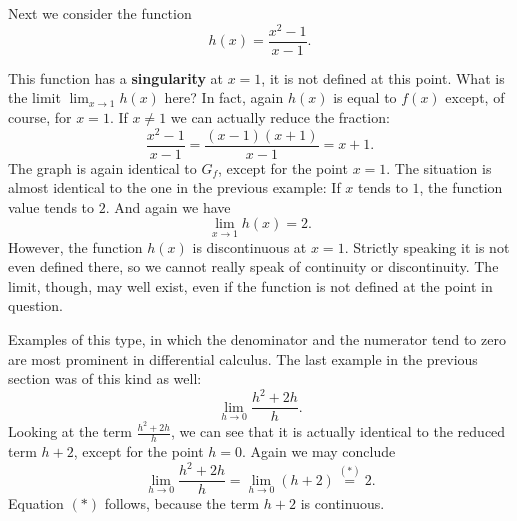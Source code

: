 \documentclass[12pt,eng]{skript_ogg}
\begin{document}
\begin{beispiel}
Next we consider the function 
\[h(x)=\frac{x^2-1}{x-1}.\]
\begin{center}
\end{center}

\vspace{-3mm}

This function has a \textbf{singularity} at $x=1$, it is not defined at this point. What is the limit $\lim_{x\rightarrow 1}h(x)$ here? In fact, again $h(x)$ is equal to $f(x)$ except, of course, for $x=1$. If $x\neq 1$ we can actually reduce the fraction:
\[\frac{x^2-1}{x-1}=\frac{(x-1)(x+1)}{x-1}=x+1.\]
The graph is again identical to $G_f$, except for the point $x=1$. The situation is almost identical to the one in the previous example: If $x$ tends to $1$, the function value tends to $2$. And again we have
\[\lim_{x\rightarrow 1}h(x)=2.\]
However, the function $h(x)$ is discontinuous at $x=1$. Strictly speaking it is not even defined there, so we cannot really speak of continuity or discontinuity. The limit, though, may well exist, even if the function is not defined at the point in question.
\end{beispiel}

Examples of this type, in which the denominator and the numerator tend to zero are most prominent in differential calculus. The last example in the previous section was of this kind as well:
\[\lim_{h\rightarrow 0}\frac{h^2+2h}{h}.\]
Looking at the term $\frac{h^2+2h}{h}$, we can see that it is actually identical to the reduced term $h+2$, except for the point $h=0$. Again we may conclude
\[\lim_{h\rightarrow 0}\frac{h^2+2h}{h}=\lim_{h\rightarrow 0}\left(h+2\right)\stackrel{(*)}{=}2.\]
Equation $(*)$ follows, because the term $h+2$ is continuous.
\end{document}
